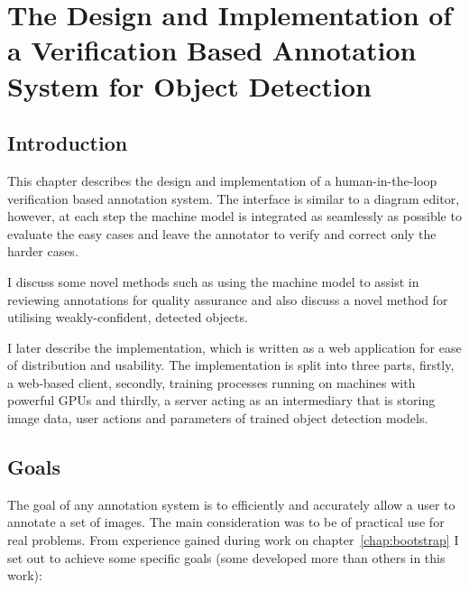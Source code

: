 \chapter{The Design and Implementation of a Verification Based Annotation System for Object Detection}
\label{chap:design} 

\section{Introduction}

This chapter describes the design and implementation of a human-in-the-loop verification based annotation system. The interface is similar to a diagram editor, however, at each step the machine model is integrated as seamlessly as possible to evaluate the easy cases and leave the annotator to verify and correct only the harder cases. 

I discuss some novel methods such as using the machine model to assist in reviewing annotations for quality assurance and also discuss a novel method for utilising weakly-confident, detected objects.

I later describe the implementation, which is written as a web application for ease of distribution and usability. The implementation is split into three parts, firstly, a web-based client, secondly, training processes running on machines with powerful \gls{GPU}s and thirdly, a server acting as an intermediary that is storing image data, user actions and parameters of trained object detection models.

\section {Goals}

The goal of any annotation system is to efficiently and accurately allow a user to annotate a set of images. The main consideration was to be of practical use for real problems. From experience gained during work on chapter~\ref{chap:bootstrap} I set out to achieve some specific goals (some developed more than others in this work):

